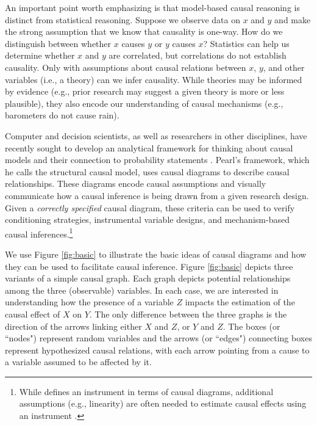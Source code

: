 \documentclass[12pt,reqno,titlepage]{amsart}
\begin{document}
\begin{doublespace}
An important point worth emphasizing is that model-based causal reasoning is distinct from statistical reasoning. 
Suppose we observe data on $x$ and $y$ and make the strong assumption that we know that causality is one-way. 
How do we distinguish between whether $x$ causes $y$ or $y$ causes $x$? 
Statistics can help us determine whether $x$ and $y$ are correlated, but correlations do not establish causality.
Only with assumptions about causal relations between $x$, $y$, and other variables (i.e., a theory) can we infer causality.
While theories may be informed by evidence (e.g., prior research may suggest a given theory is more or less plausible), they also encode our understanding of causal mechanisms (e.g., barometers do not cause rain).

Computer and decision scientists, as well as researchers in other disciplines, have recently sought to develop an analytical framework for thinking about causal models and their connection to probability statements \citep{Pearl:2009kh}.
Pearl's framework, which he calls the structural causal model, uses causal diagrams to describe causal relationships. 
These diagrams encode causal assumptions and visually communicate how a causal inference is being drawn from a given research design.
Given a \emph{correctly specified} causal diagram, these criteria can be used to verify conditioning strategies, instrumental variable designs, and mechanism-based causal inferences.\footnote{While \citet[p.248]{Pearl:2009kh} defines an instrument in terms of causal diagrams, additional assumptions (e.g., linearity) are often needed to estimate causal effects using an instrument \citep{Angrist:1996p7456}.}

We use Figure \ref{fig:basic} to illustrate the basic ideas of causal diagrams and how they can be used to facilitate causal inference.
Figure \ref{fig:basic} depicts three variants of a simple causal graph. Each graph depicts potential relationships among the three (observable) variables.
In each case, we are interested in understanding how the presence of a variable $Z$ impacts the estimation of the causal effect of $X$ on $Y$.
The only difference between the three graphs is the direction of the arrows linking either $X$ and $Z$, or $Y$ and $Z$.
The boxes (or ``nodes") represent random variables and the arrows (or ``edges") connecting boxes represent hypothesized causal relations, with each arrow pointing from a cause to a variable assumed to be affected by it.


\end{doublespace}
\end{document}
